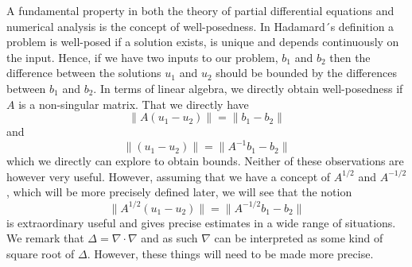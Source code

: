 A fundamental property in both the theory of partial differential equations and numerical analysis is the
concept of well-posedness. In Hadamard´s definition a problem is well-posed if a solution exists, is unique
and depends continuously on the input. Hence, if we have two inputs to our problem, $b_1$ and $b_2$ 
then the difference between the solutions $u_1$ and $u_2$ should be bounded by the differences
between $b_1$ and $b_2$. In terms of linear algebra, we directly obtain well-posedness if
$A$ is a non-singular matrix. That we directly have 
\[
\|A(u_1 - u_2) \| = \|b_1 - b_2\|     
\]
and 
\[
\|(u_1 - u_2) \| = \|A^{-1}b_1 - b_2\|     
\]
which we directly can explore to obtain bounds. Neither of these observations are however
very useful. However, assuming that we have a concept of 
$A^{1/2}$ and $A^{-1/2}$, which will be more precisely defined later, 
we will see that the notion 
\[
\|A^{1/2}(u_1 - u_2) \| = \|A^{-1/2}b_1 - b_2\|     
\]
is extraordinary useful and gives precise estimates in a wide range of situations.  
We remark that $\Delta=\nabla\cdot\nabla$ and as such $\nabla$ can be interpreted
as some kind of square root of $\Delta$. However, these things will need to be made
more precise.  






